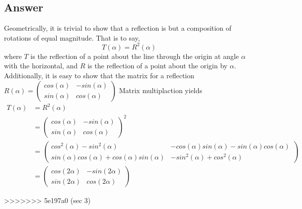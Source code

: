\documentclass[
	12pt, %
]{fphw}
\begin{document}
\subsection*{Answer}
Geometrically, it is trivial to show that a reflection is but a composition of rotations of equal magnitude. That is to say, $$ T(\alpha)=R^2(\alpha)$$ where $T$ is the reflection of a point about the line through the origin at angle $\alpha$ with the horizontal, and $R$ is the reflection of a point about the origin by $\alpha$. Additionally, it is easy to show that the matrix for a reflection $R(\alpha)=\begin{pmatrix} cos(\alpha) & -sin(\alpha)\\ sin(\alpha) & cos(\alpha) \end{pmatrix}$ 
Matrix multiplaction yields 
\begin{align}
	T(\alpha)&=R^2(\alpha) \\
	&=\begin{pmatrix} cos(\alpha) & -sin(\alpha)\\ sin(\alpha) & cos(\alpha) \end{pmatrix}^2 \\
		&=\begin{pmatrix} cos^2(\alpha)-sin^2(\alpha) & -cos(\alpha)sin(\alpha)-sin(\alpha)cos(\alpha)\\ sin(\alpha)cos(\alpha)+cos(\alpha)sin(\alpha) & -sin^2(\alpha)+cos^2(\alpha) \end{pmatrix} \\
		&=\begin{pmatrix} cos(2\alpha) & -sin(2\alpha)\\ sin(2\alpha) & cos(2\alpha) \end{pmatrix}
\end{align}

>>>>>>> 5e197a0 (sec 3)
\end{document}
